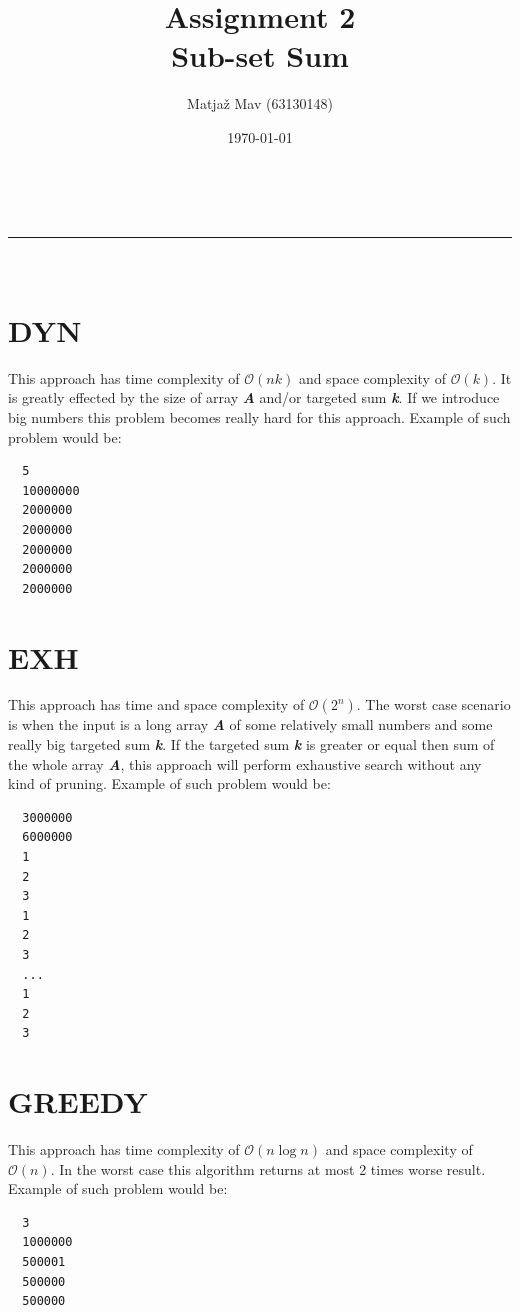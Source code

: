 \documentclass[a4paper,11pt]{article}
\makeatletter
\newcommand{\linia}{\rule{\linewidth}{0.5pt}}
\theoremstyle{mytheor}
\renewcommand{\maketitle}{
\begin{center}
\vspace{2ex}
{\huge \textsc{\@title}}
\vspace{1ex}
\\
\linia\\
\@author \hfill \@date
\vspace{4ex}
\end{center}
}
\makeatother
\begin{document}
\title{Assignment 2 \\\small{Sub-set Sum}}

\author{Matjaž Mav (63130148)}

\date{\today}

\maketitle

\section{DYN}
This approach has time complexity of $\mathcal{O}(n k)$ and space complexity of $\mathcal{O}(k)$. It is greatly effected by the size of array \textbf{\textit{A}} and/or targeted sum \textbf{\textit{k}}. If we introduce big numbers this problem becomes really hard for this approach. Example of such problem would be:

\begin{verbatim}
  5
  10000000
  2000000
  2000000
  2000000
  2000000
  2000000
\end{verbatim}

\section{EXH}
This approach has time and space complexity of $\mathcal{O}(2^n)$.
The worst case scenario is when the input is a long array \textbf{\textit{A}} of some relatively small numbers and some really big targeted sum \textbf{\textit{k}}. If the targeted sum \textbf{\textit{k}} is greater or equal then sum of the whole array \textbf{\textit{A}}, this approach will perform exhaustive search without any kind of pruning. Example of such problem would be:

\begin{verbatim}
  3000000
  6000000
  1
  2
  3
  1
  2
  3
  ...
  1
  2
  3
\end{verbatim}

\section{GREEDY}

This approach has time complexity of $\mathcal{O}(n \log{n})$ and space complexity of $\mathcal{O}(n)$. In the worst case this algorithm returns at most 2 times worse result. Example of such problem would be:

\begin{verbatim}
  3
  1000000
  500001
  500000
  500000
\end{verbatim}
\end{document}
